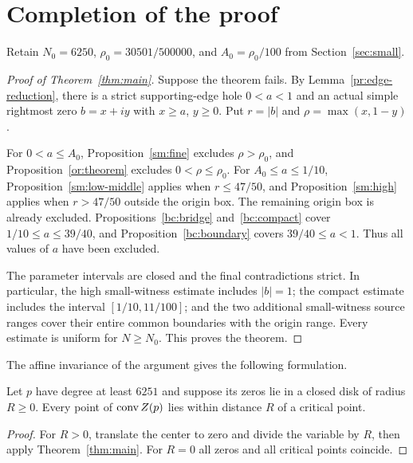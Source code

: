 \section{Completion of the proof}\label{sec:assembly}

Retain $N_0=6250$, $\rho_0=30501/500000$, and
$A_0=\rho_0/100$ from Section~\ref{sec:small}.
\begin{proof}[Proof of Theorem~\ref{thm:main}]
Suppose the theorem fails. By
Lemma~\ref{pr:edge-reduction}, there is a strict supporting-edge hole
$0<a<1$ and an actual simple rightmost zero $b=x+iy$ with
$x\ge a$, $y\ge0$. Put $r=|b|$ and $\rho=\max(x,1-y)$.

For $0<a\le A_0$, Proposition~\ref{sm:fine} excludes
$\rho>\rho_0$, and Proposition~\ref{or:theorem} excludes
$0<\rho\le\rho_0$. For $A_0\le a\le1/10$,
Proposition~\ref{sm:low-middle} applies when $r\le47/50$,
and Proposition~\ref{sm:high} applies when $r>47/50$ outside
the origin box. The remaining origin box is already excluded.
Propositions~\ref{bc:bridge} and~\ref{bc:compact} cover
$1/10\le a\le39/40$, and Proposition~\ref{bc:boundary}
covers $39/40\le a<1$. Thus all values of $a$ have been excluded.

The parameter intervals are closed and the final contradictions strict.
In particular, the high small-witness estimate includes $|b|=1$;
the compact estimate includes the interval $[1/10,11/100]$; and the
two additional small-witness source ranges cover their entire common
boundaries with the origin range. Every estimate is uniform for
$N\ge N_0$. This proves the theorem.
\end{proof}

The affine invariance of the argument gives the following formulation.
\begin{corollary}\label{cor:disk}
Let $p$ have degree at least $6251$ and suppose its zeros lie in a
closed disk of radius $R\ge0$. Every point of $\operatorname{conv} Z(p)$ lies
within distance $R$ of a critical point.
\end{corollary}
\begin{proof}
For $R>0$, translate the center to zero and divide the variable by
$R$, then apply Theorem~\ref{thm:main}. For $R=0$ all zeros and
all critical points coincide.
\end{proof}
